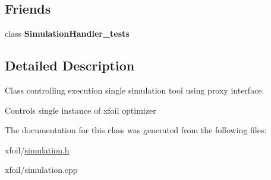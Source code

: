 \subsection*{Friends}
\begin{DoxyCompactItemize}
\item 
\hypertarget{class_simulation_handler_a51e8de548718ddb89b34351f529b40df}{}\label{class_simulation_handler_a51e8de548718ddb89b34351f529b40df} 
class {\bfseries Simulation\+Handler\+\_\+tests}
\end{DoxyCompactItemize}


\subsection{Detailed Description}
Class controlling execution single simulation tool using proxy interface. 

Controls single instance of xfoil optimizer 

The documentation for this class was generated from the following files\+:\begin{DoxyCompactItemize}
\item 
xfoil/\hyperlink{simulation_8h}{simulation.\+h}\item 
xfoil/simulation.\+cpp\end{DoxyCompactItemize}
